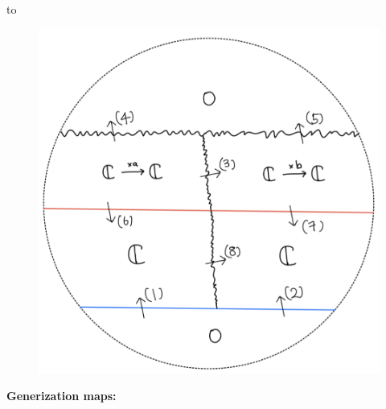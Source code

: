 to
\begin{figure}[H]
    \centering
    \includegraphics[scale = 0.45]{diagrams/lemma2/47.png} 
    \caption{}
    \label{fig:your-label}
\end{figure}
\textbf{Generization maps:}
